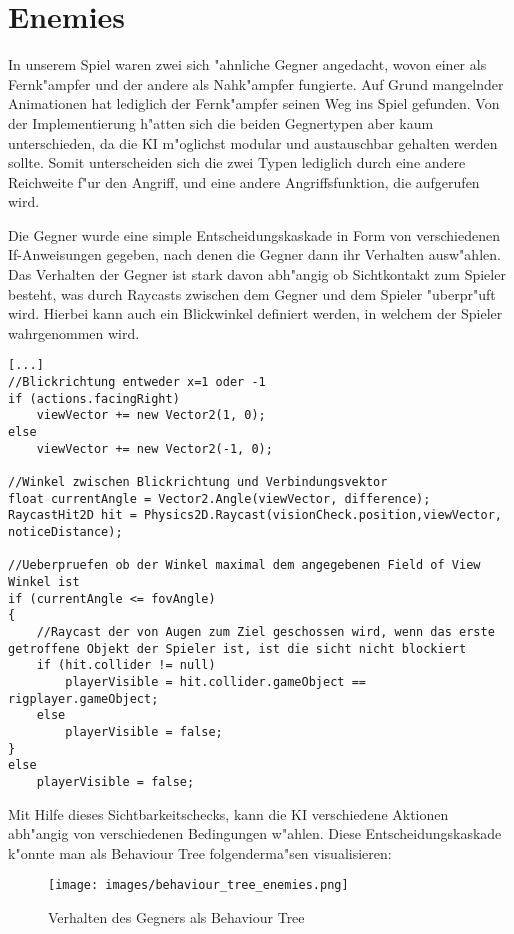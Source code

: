 \chapter{Enemies}
In unserem Spiel waren zwei sich "ahnliche Gegner angedacht, wovon einer als Fernk"ampfer und der andere als Nahk"ampfer fungierte. Auf Grund mangelnder Animationen hat lediglich der Fernk"ampfer seinen Weg ins Spiel gefunden. Von der Implementierung h"atten sich die beiden Gegnertypen aber kaum unterschieden, da die KI m"oglichst modular und austauschbar gehalten werden sollte. Somit unterscheiden sich die zwei Typen lediglich durch eine andere Reichweite f"ur den Angriff, und eine andere Angriffsfunktion, die aufgerufen wird.\newline

Die Gegner wurde eine simple Entscheidungskaskade in Form von verschiedenen If-Anweisungen gegeben, nach denen die Gegner dann ihr Verhalten ausw"ahlen. Das Verhalten der Gegner ist stark davon abh"angig ob Sichtkontakt zum Spieler besteht, was durch Raycasts zwischen dem Gegner und dem Spieler "uberpr"uft wird.  Hierbei kann auch ein Blickwinkel definiert werden, in welchem der Spieler wahrgenommen wird.

\begin{lstlisting}[breaklines=true]
[...]
//Blickrichtung entweder x=1 oder -1
if (actions.facingRight)
    viewVector += new Vector2(1, 0);
else
    viewVector += new Vector2(-1, 0);

//Winkel zwischen Blickrichtung und Verbindungsvektor
float currentAngle = Vector2.Angle(viewVector, difference);
RaycastHit2D hit = Physics2D.Raycast(visionCheck.position,viewVector, noticeDistance);

//Ueberpruefen ob der Winkel maximal dem angegebenen Field of View Winkel ist
if (currentAngle <= fovAngle)
{
    //Raycast der von Augen zum Ziel geschossen wird, wenn das erste getroffene Objekt der Spieler ist, ist die sicht nicht blockiert
    if (hit.collider != null)
        playerVisible = hit.collider.gameObject == rigplayer.gameObject;
	else
		playerVisible = false;
}
else
	playerVisible = false;

\end{lstlisting}

Mit Hilfe dieses Sichtbarkeitschecks, kann die KI verschiedene Aktionen abh"angig von verschiedenen Bedingungen w"ahlen.
Diese Entscheidungskaskade k"onnte man als Behaviour Tree folgenderma"sen visualisieren:

\begin{figure}
	\centering
	\texttt{[image: images/behaviour\_tree\_enemies.png]}
	\caption{Verhalten des Gegners als Behaviour Tree}
	\label{fig:screen_pre}
\end{figure}

